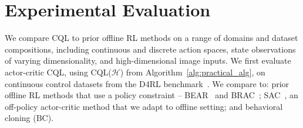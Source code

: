 \vspace{-10pt}
\section{Experimental Evaluation}
\label{sec:experiments}
\vspace{-8pt}




We compare CQL to prior offline RL methods on a range of domains and dataset compositions, including continuous and discrete action spaces, state observations of varying dimensionality, and high-dimensional image inputs. We first evaluate actor-critic CQL, using CQL($\mathcal{H}$) from Algorithm~\ref{alg:practical_alg}, on continuous control datasets from the D4RL benchmark~\citep{d4rl}.
We compare to: prior offline RL methods that use a policy constraint -- BEAR~\citep{kumar2019stabilizing} and BRAC~\citep{wu2019behavior}; SAC~\citep{haarnoja}, an off-policy actor-critic method that we adapt to offline setting; and behavioral cloning (BC). 

